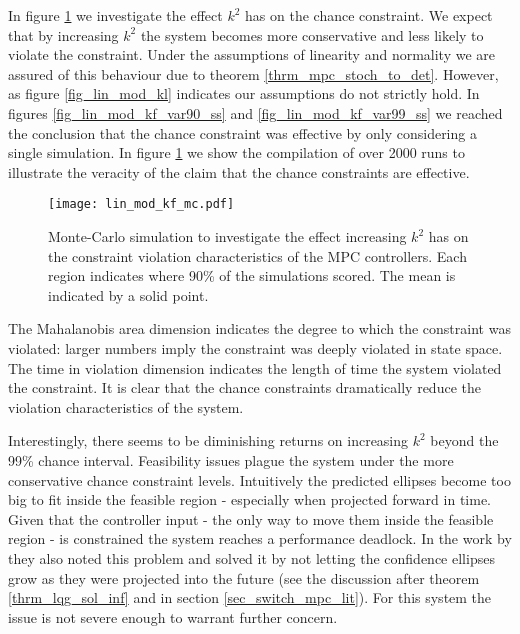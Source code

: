 In figure \ref{fig_lin_mod_kf_mc} we investigate the effect $k^2$ has on the chance constraint. We expect that by increasing $k^2$ the system becomes more conservative and less likely to violate the constraint. Under the assumptions of linearity and normality we are assured of this behaviour due to theorem \ref{thrm_mpc_stoch_to_det}. However, as figure \ref{fig_lin_mod_kl} indicates our assumptions do not  strictly hold. In figures \ref{fig_lin_mod_kf_var90_ss} and \ref{fig_lin_mod_kf_var99_ss} we reached the conclusion that the chance constraint was effective by only considering a single simulation. In figure \ref{fig_lin_mod_kf_mc} we show the compilation of over 2000 runs to illustrate the veracity of the claim that the chance constraints are effective.
\begin{figure}[H] 
\centering
\texttt{[image: lin\_mod\_kf\_mc.pdf]}
\caption{Monte-Carlo simulation to investigate the effect increasing $k^2$ has on the constraint violation characteristics of the MPC controllers. Each region indicates where 90\% of the simulations scored. The mean is indicated by a solid point.}
\label{fig_lin_mod_kf_mc}
\end{figure}
The Mahalanobis area dimension indicates the degree to which the constraint was violated: larger numbers imply the constraint was deeply violated in state space. The time in violation dimension indicates the length of time the system violated the constraint. It is clear that the chance constraints dramatically reduce the violation characteristics of the system. 

Interestingly, there seems to be diminishing returns on increasing $k^2$ beyond the 99\% chance interval. Feasibility issues plague the system under the more conservative chance constraint levels. Intuitively the predicted ellipses become too big to fit inside the feasible region - especially when projected forward in time. Given that the controller input - the only way to move them inside the feasible region - is constrained the system reaches a performance deadlock. In the work by \cite{yan1} they also noted this problem and solved it by not letting the confidence ellipses grow as they were projected into the future (see the discussion after theorem \ref{thrm_lqg_sol_inf} and in section \ref{sec_switch_mpc_lit}). For this system the issue is not severe enough to warrant further concern.   

